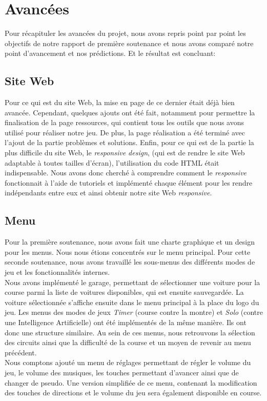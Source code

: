 \documentclass[12pt,a4paper]{article}
\newcommand{\AI}{Intelligence Artificielle}
\begin{document}
    \section{Avancées}
        Pour récapituler les avancées du projet, nous avons repris point par point les objectifs de 
        notre rapport de première soutenance et nous avons comparé notre point d'avancement et nos 
        prédictions. Et le résultat est concluant:
        
        \subsection{Site Web}
            Pour ce qui est du site Web, la mise en page de ce dernier était déjà bien avancée. 
            Cependant, quelques ajouts ont été fait, notamment pour permettre la finalisation de la 
            page ressources, qui contient tous les outils que nous avons utilisé pour réaliser notre 
            jeu. De plus, la page réalisation a été terminé avec l'ajout de la partie 
            problèmes et solutions.
            Enfin, pour ce qui est de la partie la plus difficile du site Web, le \textsl{responsive 
            design}, (qui est de rendre le site Web adaptable à toutes tailles d'écran), l'utilisation 
            du code HTML était indispensable. Nous avons donc cherché à comprendre comment le 
            \textsl{responsive} fonctionnait à l'aide de tutoriels et implémenté chaque élément 
            pour les rendre indépendants entre eux et ainsi obtenir notre site Web \textsl{responsive}.
        
        \subsection{Menu}
            Pour la première soutenance, nous avons fait une charte graphique et un design pour les 
            menus.
            Nous nous étions concentrés sur le menu principal. Pour cette seconde soutenance, nous 
            avons travaillé les
            sous-menus des différents modes de jeu et les fonctionnalités internes.\\
            Nous avons implémenté le garage, permettant de
            sélectionner une voiture pour la course parmi la liste de voitures disponibles, qui
            est ensuite sauvegardée. La voiture sélectionnée s'affiche ensuite dans le menu principal
            à la place du logo du jeu. Les menus des modes de
            jeux \textsl{Timer} (course contre la montre) et \textsl{Solo} (contre une \AI) ont
            été implémentés de la même manière. Ils ont donc une structure similaire. Au sein de
            ces menus, nous retrouvons la sélection des circuits ainsi que la difficulté de la course et
            un moyen de revenir au menu précédent.\\
            Nous comptons ajouté un menu de réglages permettant de régler le volume du jeu, le volume
            des musiques, les touches permettant d'avancer ainsi que de changer de pseudo. Une 
            version simplifiée de ce menu, contenant la modification des touches de directions et le
            volume du jeu sera également disponible en course.
\end{document}
